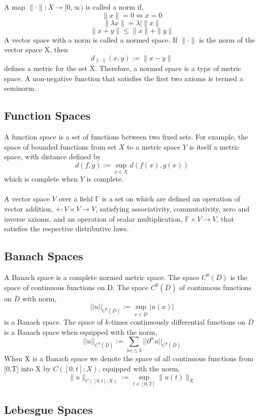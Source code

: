 \documentclass[12pt]{article}
\begin{document}
\begin{flushleft}
A map $\|\cdot\|: X\rightarrow [0,\infty)$ is called a norm if,
$$\|x\| = 0 \Leftrightarrow x=0$$
$$\|\lambda x\| = \lambda| \|x\|$$
$$\|x+y\| \leq \|x\| + \|y\|$$
A vector space with a norm is called a normed space. If $\|\cdot \|$ is the norm of the vector space X, then 
$$d_{\|\cdot\|}(x,y) := \|x-y\|$$
defines a metric for the set X. Therefore, a normed space is a type of metric space. A non-negative function that satisfies the first two axioms is termed a seminorm.

\subsection{Function Spaces}

A function space is a set of functions between two fixed sets. For example, the space of bounded functions from set $X$ to a metric space $Y$ is itself a metric space, with distance defined by
$$d(f,g) := \sup_{x\in X}d(f(x),g(x))$$
which is complete when $Y$ is complete. 
\\~\\
A vector space $V$ over a field $\mathbb{F}$ is a set on which are defined an operation of vector addition, $+:V\times V \rightarrow V$, satisfying associativity, commutativity, zero and inverse axioms, and an operation of scalar multiplication, $\mathbb{F}\times V \rightarrow V$, that satisfies the respective distributive laws.

\subsection{Banach Spaces}

A Banach space is a complete normed metric space. The space $C^0(D)$ is the space of continuous functions on D. The space $C^0(\overline{D})$ of continuous functions on $\overline{D}$ with norm,
$$||u||_{C^0(\overline{D})}:=\sup_{x\in \overline{D}}|u(x)|$$
is a Banach space. The space of $k$-times continuously differential functions on $\overline{D}$ is a Banach space when equipped with the norm,
$$||u||_{C^k(\overline{D})}:=\sum_{|\alpha|\leq k}||\partial^\alpha u||_{C^k(\overline{D})}$$
When X is a Banach space we denote the space of all continuous functions from [0,T] into X by $C([0,t];X)$, equipped with the norm,
$$\|u\|_{C([0,t];X)} := \sup_{t\in[0,T]}\|u(t)\|_X$$

\subsection{Lebesgue Spaces}


\end{flushleft}
\end{document}
